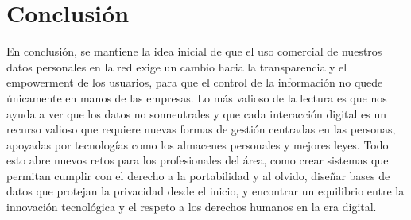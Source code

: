 \section*{Conclusión}
En conclusión, se mantiene la idea inicial de que el uso comercial de nuestros datos personales en la red exige un cambio hacia la transparencia y el empowerment de los usuarios, para que el control de la información no quede únicamente en manos de las empresas. Lo más valioso de la lectura es que nos ayuda a ver que los datos no sonneutrales y que cada interacción digital es un recurso valioso que requiere nuevas formas de gestión centradas en las personas, apoyadas por tecnologías como los almacenes personales y mejores leyes. Todo esto abre nuevos retos para los profesionales del área, como crear sistemas que permitan cumplir con el derecho a la portabilidad y al olvido, diseñar bases de datos que protejan la privacidad desde el inicio, y encontrar un equilibrio entre la innovación tecnológica y el respeto a los derechos humanos en la era digital.

%


